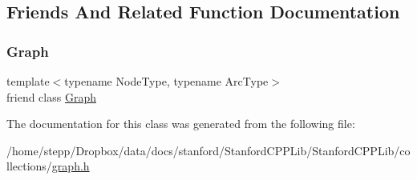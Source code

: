 \subsection{Friends And Related Function Documentation}
\mbox{\label{classGraph_1_1graph__iterator_afab89afd724f1b07b1aaad6bdc61c47a}} 
\subsubsection{\texorpdfstring{Graph}{Graph}}
{\footnotesize\ttfamily template$<$typename Node\+Type, typename Arc\+Type$>$ \\
friend class \mbox{\hyperlink{classGraph}{Graph}}\hspace{0.3cm}{\ttfamily [friend]}}



The documentation for this class was generated from the following file\+:\begin{DoxyCompactItemize}
\item 
/home/stepp/\+Dropbox/data/docs/stanford/\+Stanford\+C\+P\+P\+Lib/\+Stanford\+C\+P\+P\+Lib/collections/\mbox{\hyperlink{graph_8h}{graph.\+h}}\end{DoxyCompactItemize}
